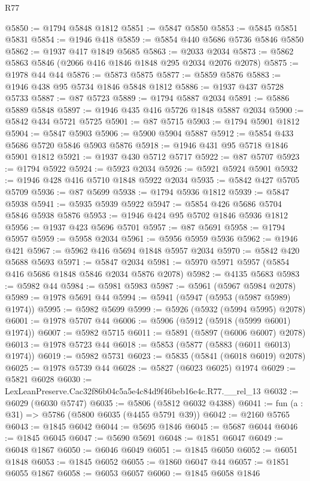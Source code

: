 \begin{lexlean}{R77}
\begin{coremodule}
@5850 := @1794 @5848 @1812
@5851 := @5847 @5850
@5853 := @5845 @5851 @5831
@5854 := @1946 @418
@5859 := @5854 @440 @5686 @5736 @5846 @5850
@5862 := @1937 @417 @1849 @5685
@5863 := @2033 @2034
@5873 := @5862 @5863 @5846 (@2066 @416 @1846 @1848 @295 @2034 @2076 @2078)
@5875 := @1978 @44 @44
@5876 := @5873 @5875
@5877 := @5859 @5876
@5883 := @1946 @438 @95 @5734 @1846 @5848 @1812
@5886 := @1937 @437 @5728 @5733
@5887 := @87 @5723
@5889 := @1794 @5887 @2034
@5891 := @5886 @5889 @5848
@5897 := @1946 @435 @416 @5726 @1848 @5887 @2034
@5900 := @5842 @434 @5721 @5725
@5901 := @87 @5715
@5903 := @1794 @5901 @1812
@5904 := @5847 @5903
@5906 := @5900 @5904 @5887
@5912 := @5854 @433 @5686 @5720 @5846 @5903 @5876
@5918 := @1946 @431 @95 @5718 @1846 @5901 @1812
@5921 := @1937 @430 @5712 @5717
@5922 := @87 @5707
@5923 := @1794 @5922
@5924 := @5923 @2034
@5926 := @5921 @5924 @5901
@5932 := @1946 @428 @416 @5710 @1848 @5922 @2034
@5935 := @5842 @427 @5705 @5709
@5936 := @87 @5699
@5938 := @1794 @5936 @1812
@5939 := @5847 @5938
@5941 := @5935 @5939 @5922
@5947 := @5854 @426 @5686 @5704 @5846 @5938 @5876
@5953 := @1946 @424 @95 @5702 @1846 @5936 @1812
@5956 := @1937 @423 @5696 @5701
@5957 := @87 @5691
@5958 := @1794 @5957
@5959 := @5958 @2034
@5961 := @5956 @5959 @5936
@5962 := @1946 @421
@5967 := @5962 @416 @5694 @1848 @5957 @2034
@5970 := @5842 @420 @5688 @5693
@5971 := @5847 @2034
@5981 := @5970 @5971 @5957 (@5854 @416 @5686 @1848 @5846 @2034 @5876 @2078)
@5982 := @4135 @5683
@5983 := @5982 @44
@5984 := @5981 @5983
@5987 := @5961 (@5967 @5984 @2078)
@5989 := @1978 @5691 @44
@5994 := @5941 (@5947 (@5953 (@5987 @5989) @1974))
@5995 := @5982 @5699
@5999 := @5926 (@5932 (@5994 @5995) @2078)
@6001 := @1978 @5707 @44
@6006 := @5906 (@5912 (@5918 (@5999 @6001) @1974))
@6007 := @5982 @5715
@6011 := @5891 (@5897 (@6006 @6007) @2078)
@6013 := @1978 @5723 @44
@6018 := @5853 (@5877 (@5883 (@6011 @6013) @1974))
@6019 := @5982 @5731
@6023 := @5835 (@5841 (@6018 @6019) @2078)
@6025 := @1978 @5739 @44
@6028 := @5827 (@6023 @6025) @1974
@6029 := @5821 @6028
@6030 := LexLeanPreserve.Cac32f86b04c5a5e4c84d9f46beb16e4c.R77.__rel_13
@6032 := @6029 (@6030 @5747)
@6035 := @5806 (@5812 @6032 @4388)
@6041 := fun (a : @31) => @5786 (@5800 @6035 (@4455 @5791 @39))
@6042 := @2160 @5765
@6043 := @1845 @6042
@6044 := @5695 @1846
@6045 := @5687 @6044
@6046 := @1845 @6045
@6047 := @5690 @5691
@6048 := @1851 @6047
@6049 := @6048 @1867
@6050 := @6046 @6049
@6051 := @1845 @6050
@6052 := @6051 @1848
@6053 := @1845 @6052
@6055 := @1860 @6047 @44
@6057 := @1851 @6055 @1867
@6058 := @6053 @6057
@6060 := @1845 @6058 @1846

\end{coremodule}
\end{lexlean}
